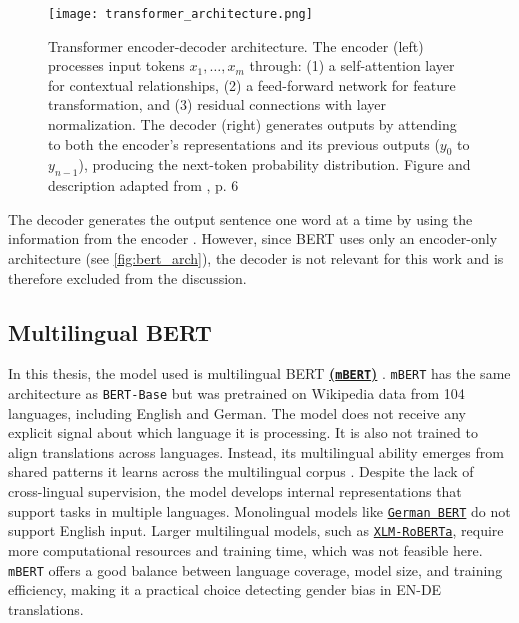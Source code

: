 \begin{figure}[ht]
    \centering
	\texttt{[image: transformer\_architecture.png]}	
        \caption[Transformer encoder-decoder architecture overview]{Transformer encoder-decoder architecture. The encoder (left) processes input tokens \(x_1,\dots,x_m\) through: (1) a self-attention layer for contextual relationships, (2) a feed-forward network for feature transformation, and (3) residual connections with layer normalization. The decoder (right) generates outputs by attending to both the encoder's representations and its previous outputs ($y_0$ to $y_{n-1}$), producing the next-token probability distribution. Figure and description adapted from \textcite{xiaoIntroductionTransformersNLP2023}, p. 6}
    \label{fig:transformer_architecture}
\end{figure}

The decoder generates the output sentence one word at a time by using the information from the encoder \parencite{xiaoIntroductionTransformersNLP2023}. However, since BERT uses only an encoder-only architecture (see \autoref{fig:bert_arch}), the decoder is not relevant for this work and is therefore excluded from the discussion.

\subsection{Multilingual BERT}
    In this thesis, the model used is multilingual BERT \textbf{\href{https://huggingface.co/google-bert/bert-base-multilingual-cased}{(\texttt{mBERT})}} \parencite{devlinBERTPretrainingDeep2019}. \texttt{mBERT} has the same architecture as \texttt{BERT-Base} but was pretrained on Wikipedia data from 104 languages, including English and German. The model does not receive any explicit signal about which language it is processing. It is also not trained to align translations across languages. Instead, its multilingual ability emerges from shared patterns it learns across the multilingual corpus \parencite{piresHowMultilingualMultilingual2019}. Despite the lack of cross-lingual supervision, the model develops internal representations that support tasks in multiple languages. Monolingual models like \href{https://huggingface.co/google-bert/bert-base-german-cased}{\texttt{German BERT}} do not support English input. Larger multilingual models, such as \href{https://huggingface.co/docs/transformers/en/model_doc/xlm-roberta}{\texttt{XLM-RoBERTa}}, require more computational resources and training time, which was not feasible here. \texttt{mBERT} offers a good balance between language coverage, model size, and training efficiency, making it a practical choice detecting gender bias in EN-DE translations.

